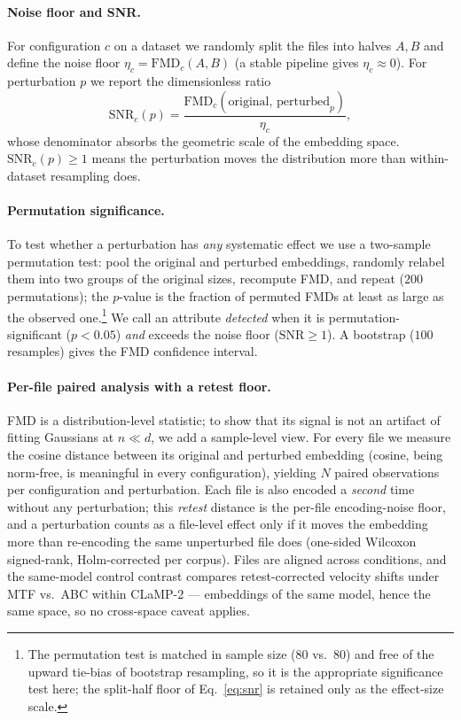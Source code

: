 \documentclass[11pt]{article}
\newcommand{\snr}{\mathrm{SNR}}
\newcommand{\fmd}{\mathrm{FMD}}
\begin{document}
\paragraph{Noise floor and SNR.}
For configuration $c$ on a dataset we randomly split the files into halves
$A,B$ and define the noise floor $\eta_c=\fmd_c(A,B)$ (a stable pipeline
gives $\eta_c\!\approx\!0$). For perturbation $p$ we report the
dimensionless ratio
\begin{equation}
\snr_c(p)=\frac{\fmd_c(\text{original},\,\text{perturbed}_p)}{\eta_c},
\label{eq:snr}
\end{equation}
whose denominator absorbs the geometric scale of the embedding space.
$\snr_c(p)\ge 1$ means the perturbation moves the distribution more than
within-dataset resampling does.

\paragraph{Permutation significance.}
To test whether a perturbation has \emph{any} systematic effect we use a
two-sample permutation test: pool the original and perturbed embeddings,
randomly relabel them into two groups of the original sizes, recompute FMD,
and repeat ($200$ permutations); the $p$-value is the fraction of permuted
FMDs at least as large as the observed one.\footnote{The permutation test
is matched in sample size ($80$ vs.\ $80$) and free of the upward tie-bias
of bootstrap resampling, so it is the appropriate significance test here;
the split-half floor of Eq.~\eqref{eq:snr} is retained only as the
effect-size scale.} We call an attribute \emph{detected} when it is
permutation-significant ($p<0.05$) \emph{and} exceeds the noise floor
($\snr\ge1$). A bootstrap ($100$ resamples) gives the FMD confidence
interval.

\paragraph{Per-file paired analysis with a retest floor.}
FMD is a distribution-level statistic; to show that its signal is not an
artifact of fitting Gaussians at $n\ll d$, we add a sample-level view. For
every file we measure the cosine distance between its original and
perturbed embedding (cosine, being norm-free, is meaningful in every
configuration), yielding $N$ paired observations per configuration and
perturbation. Each file is also encoded a \emph{second} time without any
perturbation; this \emph{retest} distance is the per-file encoding-noise
floor, and a perturbation counts as a file-level effect only if it moves
the embedding more than re-encoding the same unperturbed file does
(one-sided Wilcoxon signed-rank, Holm-corrected per corpus). Files are
aligned across conditions, and the same-model control contrast compares
retest-corrected velocity shifts under MTF vs.\ ABC within CLaMP-2 ---
embeddings of the same model, hence the same space, so no cross-space
caveat applies.
\end{document}
